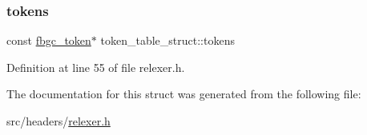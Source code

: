 \subsubsection{\texorpdfstring{tokens}{tokens}}
{\footnotesize\ttfamily const \hyperlink{tokens_8h_a9d21ebbf42e602eb0cf502c867d20a7e}{fbgc\+\_\+token}$\ast$ token\+\_\+table\+\_\+struct\+::tokens}



Definition at line 55 of file relexer.\+h.



The documentation for this struct was generated from the following file\+:\begin{DoxyCompactItemize}
\item 
src/headers/\hyperlink{relexer_8h}{relexer.\+h}\end{DoxyCompactItemize}
